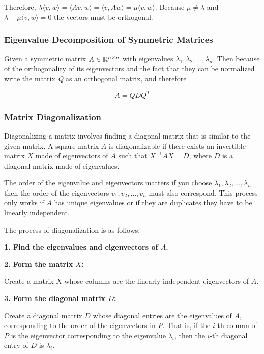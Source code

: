 Therefore, \(\lambda \langle v, w \rangle = \langle Av, w \rangle = \langle v, Aw\rangle 
= \mu \langle v, w \rangle\). Because \(\mu \ne \lambda\) and \(\lambda - \mu \langle v, w\rangle = 0\)
the vectors must be orthogonal.

\QED

\subsubsection{Eigenvalue Decomposition of Symmetric Matrices}

Given a symmetric matrix \(A \in \mathbb{R}^{n \times n}\) with eigenvalues 
\(\lambda_1, \lambda_2, \dots, \lambda_n\). Then because of the orthogonality of its eigenvectors and 
the fact that they can be normalized write the matrix \emph{Q} as an orthogonal matrix, and therefore

\[
    A = Q D Q^T
\]

\subsubsection{Matrix Diagonalization}

Diagonalizing a matrix involves finding a diagonal matrix that is similar to the given matrix. 
A square matrix \(A\) is diagonalizable if there exists an invertible matrix \(X\) made of eigenvectors of 
\(A\) such that \(X^{-1}AX = D\), where \(D\) is a diagonal matrix made of eigenvalues.

The order of the eigenvalue and eigenvectors matters if you choose 
\(\lambda_1, \lambda_2, \dots, \lambda_n\) then the order of the eigenvectors 
\(v_1, v_2, \dots, v_n\) must also correspond. This process only works if \(A\) 
has unique eigenvalues or if they are duplicates they have to be linearly independent.

The process of diagonalization is as follows:

\textbf{1. Find the eigenvalues and eigenvectors of \(A\).}

\textbf{2. Form the matrix \(X\):}

Create a matrix \(X\) whose columns are the linearly independent eigenvectors of \(A\).

\textbf{3. Form the diagonal matrix \(D\):} 

Create a diagonal matrix \(D\) whose diagonal entries are the eigenvalues of \(A\), corresponding to 
the order of the eigenvectors in \(P\). That is, if the \(i\)-th column of \(P\) is the eigenvector 
corresponding to the eigenvalue \(\lambda_i\), then the \(i\)-th diagonal entry of \(D\) is \(\lambda_i\).

